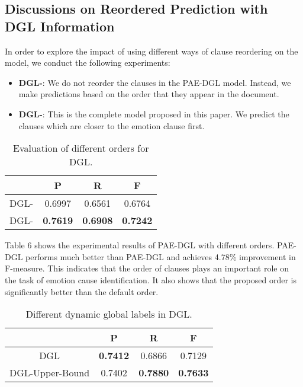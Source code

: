 \documentclass[letterpaper]{article} \usepackage{aaai19}  \usepackage{times}  \usepackage{helvet}  \usepackage{courier}  \usepackage{url}  \usepackage{graphicx}  \frenchspacing  \setlength{\pdfpagewidth}{8.5in}  \setlength{\pdfpageheight}{11in}  \setcounter{secnumdepth}{0}
\begin{document}
\subsection{Discussions on Reordered Prediction with DGL Information}

In order to explore the impact of using different ways of clause reordering on the model, we conduct the following experiments:

\begin{itemize}
	\item \textbf{DGL-}: We do not reorder the clauses in the PAE-DGL model. Instead, we make predictions based on the order that they appear in the document.
	\item \textbf{DGL-}: This is the complete model proposed in this paper. We predict the clauses which are closer to the emotion clause first.
\end{itemize}

\begin{table}
	
	\centering
	\caption{\label{font-table} Evaluation of different orders for DGL. }
	\begin{tabular} {c|c|c|c}
		\hline    & P & R & F\\
		\hline
		DGL- & 0.6997 & 0.6561 & 0.6764 \\
		DGL- & \textbf{0.7619} & \textbf{0.6908} & \textbf{0.7242} \\
		\hline
	\end{tabular}
	\label{tab:table1}
\end{table}

Table 6 shows the experimental results of PAE-DGL with different orders. PAE-DGL performs much better than PAE-DGL and achieves 4.78\% improvement in F-measure. This indicates that the order of clauses plays an important role on the task of emotion cause identification. It also shows that the proposed order is significantly better than the default order.


\begin{table}
	
	\centering
	\caption{\label{font-table} Different dynamic global labels in DGL. }
	\begin{tabular} {c|c|c|c}
		\hline    & P & R & F\\
		\hline
		DGL & \textbf{0.7412} & 0.6866 & 0.7129 \\
		DGL-Upper-Bound & 0.7402 & \textbf{0.7880} & \textbf{0.7633} \\
		\hline
	\end{tabular}
	\label{tab:table1}
\end{table}
\end{document}
